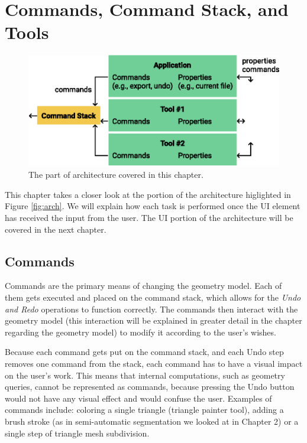 \chapter{Commands, Command Stack, and Tools}

\begin{figure}[b]
	\centering
	\includegraphics[scale=0.9]{images/architecture_commandstack}
	\caption{The part of architecture covered in this chapter.}
	\label{fig:architecture_commandstack}
\end{figure}

This chapter takes a closer look at the portion of the architecture higlighted in Figure \ref{fig:arch}. We will explain how each task is performed once the UI element has received the input from the user. The UI portion of the architecture will be covered in the next chapter.


\section{Commands}
Commands are the primary means of changing the geometry model. Each of them gets executed and placed on the command stack, which allows for the \textit{Undo and Redo} operations to function correctly. The commands then interact with the geometry model (this interaction will be explained in greater detail in the chapter regarding the geometry model) to modify it according to the user's wishes.

Because each command gets put on the command stack, and each Undo step removes one command from the stack, each command has to have a visual impact on the user's work. This means that internal computations, such as geometry queries, cannot be represented as commands, because pressing the Undo button would not have any visual effect and would confuse the user. Examples of commands include: coloring a single triangle (triangle painter tool), adding a brush stroke (as in semi-automatic segmentation we looked at in Chapter 2) or a single step of triangle mesh subdivision.


